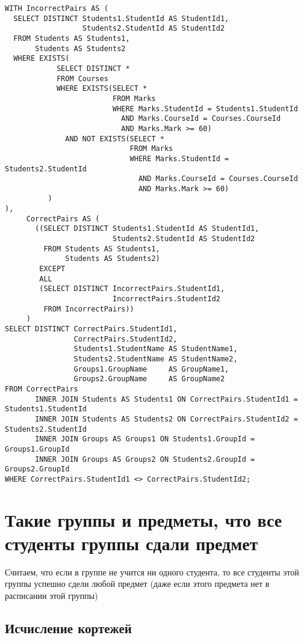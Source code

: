 \documentclass{article}
\begin{document}
\begin{verbatim}
WITH IncorrectPairs AS (
  SELECT DISTINCT Students1.StudentId AS StudentId1,
                  Students2.StudentId AS StudentId2
  FROM Students AS Students1,
       Students AS Students2
  WHERE EXISTS(
            SELECT DISTINCT *
            FROM Courses
            WHERE EXISTS(SELECT *
                         FROM Marks
                         WHERE Marks.StudentId = Students1.StudentId
                           AND Marks.CourseId = Courses.CourseId
                           AND Marks.Mark >= 60)
              AND NOT EXISTS(SELECT *
                             FROM Marks
                             WHERE Marks.StudentId = Students2.StudentId
                               AND Marks.CourseId = Courses.CourseId
                               AND Marks.Mark >= 60)
          )
),
     CorrectPairs AS (
       ((SELECT DISTINCT Students1.StudentId AS StudentId1,
                         Students2.StudentId AS StudentId2
         FROM Students AS Students1,
              Students AS Students2)
        EXCEPT
        ALL
        (SELECT DISTINCT IncorrectPairs.StudentId1,
                         IncorrectPairs.StudentId2
         FROM IncorrectPairs))
     )
SELECT DISTINCT CorrectPairs.StudentId1,
                CorrectPairs.StudentId2,
                Students1.StudentName AS StudentName1,
                Students2.StudentName AS StudentName2,
                Groups1.GroupName     AS GroupName1,
                Groups2.GroupName     AS GroupName2
FROM CorrectPairs
       INNER JOIN Students AS Students1 ON CorrectPairs.StudentId1 = Students1.StudentId
       INNER JOIN Students AS Students2 ON CorrectPairs.StudentId2 = Students2.StudentId
       INNER JOIN Groups AS Groups1 ON Students1.GroupId = Groups1.GroupId
       INNER JOIN Groups AS Groups2 ON Students2.GroupId = Groups2.GroupId
WHERE CorrectPairs.StudentId1 <> CorrectPairs.StudentId2;
\end{verbatim}

\section{Такие группы и предметы, что все студенты группы сдали предмет}

Считаем, что если в группе не учится ни одного студента, то все студенты этой группы успешно сдели любой предмет (даже если этого предмета нет в расписании этой группы)

\subsection{Исчисление кортежей}
\end{document}

